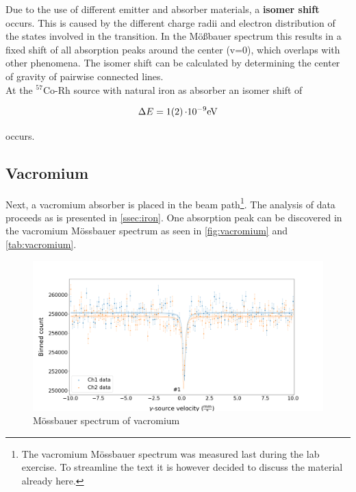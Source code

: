 

Due to the use of different emitter and absorber materials, a \textbf{isomer shift} occurs. This is caused by the different charge radii and electron distribution of the states involved in the transition.
 In the Mößbauer spectrum this results in a fixed shift of all absorption peaks around  the center (v=0), which overlaps with other phenomena. The isomer shift can be calculated by determining the center of gravity of pairwise connected lines. \\
At the $^{57}$Co-Rh source with natural iron as absorber an isomer shift of

\begin{equation}
\label{eq:isofe}
\Delta E = \SI{1 \pm 2}{\cdot 10^{-9} eV}
\end{equation}

occurs.

\subsection{Vacromium}
\label{ssec:vacromium}

Next, a vacromium absorber is placed in the beam path\footnote{The vacromium
Mössbauer spectrum was measured last during the lab exercise. To streamline the text 
it is however decided to discuss the material already here.}. The analysis of data 
proceeds as is presented in \autoref{ssec:iron}. One absorption peak can be
discovered in the vacromium Mössbauer spectrum as seen in \autoref{fig:vacromium} and
\autoref{tab:vacromium}.

\begin{figure}
	\centering
	\includegraphics[width=1.0\textwidth]{./fig/Vacromium.png}
	\caption{Mössbauer spectrum of vacromium}
	\label{fig:vacromium}
\end{figure}


